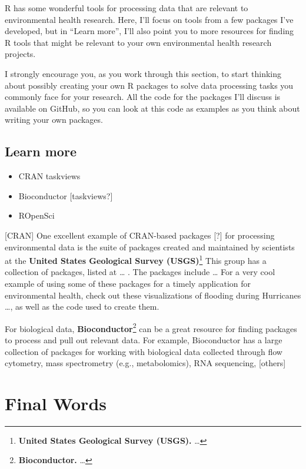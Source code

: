 \documentclass[]{tufte-book}
\providecommand{\tightlist}{%
  \setlength{\itemsep}{0pt}\setlength{\parskip}{0pt}}
\begin{document}
R has some wonderful tools for processing data that are relevant to environmental health research.
Here, I'll focus on tools from a few packages I've developed, but in ``Learn more'', I'll also
point you to more resources for finding R tools that might be relevant to your own environmental
health research projects.

I strongly encourage you, as you work through this section, to start thinking about possibly
creating your own R packages to solve data processing tasks you commonly face for your research.
All the code for the packages I'll discuss is available on GitHub, so you can look at this code
as examples as you think about writing your own packages.

\hypertarget{learn-more-4}{%
\section{Learn more}\label{learn-more-4}}

\begin{itemize}
\tightlist
\item
  CRAN taskviews
\item
  Bioconductor {[}taskviews?{]}
\item
  ROpenSci
\end{itemize}

{[}CRAN{]} One excellent example of CRAN-based packages {[}?{]} for processing environmental
data is the suite of packages created and maintained by scientists at the \textbf{United States
Geological Survey (USGS)}\footnote{\textbf{United States Geological Survey (USGS).} \ldots{}}
This group has a collection of packages, listed at \ldots{} . The packages include \ldots{}
For a very cool example of using some of these packages for a timely application for
environmental health, check out these visualizations of flooding during Hurricanes \ldots{},
as well as the code used to create them.

For biological data, \textbf{Bioconductor}\footnote{\textbf{Bioconductor.} \ldots{}} can be a great
resource for finding packages to process and pull out relevant data. For example,
Bioconductor has a large collection of packages for working with biological data collected
through flow cytometry, mass spectrometry (e.g., metabolomics), RNA sequencing, {[}others{]}

\hypertarget{final-words}{%
\chapter{Final Words}\label{final-words}}


\end{document}
